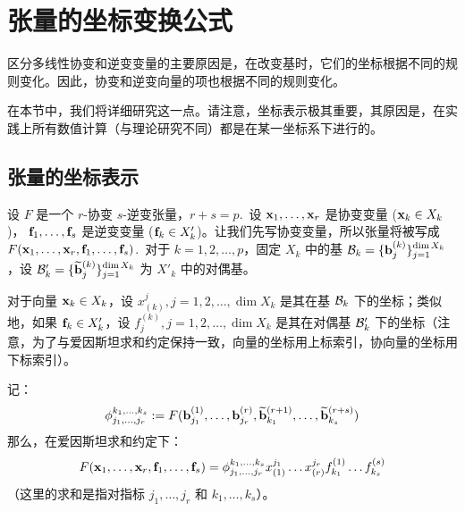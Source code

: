 \section{张量的坐标变换公式}\label{sec:08-06}


区分多线性协变和逆变变量的主要原因是，在改变基时，它们的坐标根据不同的规则变化。因此，协变和逆变向量的项也根据不同的规则变化。

在本节中，我们将详细研究这一点。请注意，坐标表示极其重要，其原因是，在实践上所有数值计算（与理论研究不同）都是在某一坐标系下进行的。

\subsection{张量的坐标表示}\label{sec:08-06-01}
设 $F$ 是一个 $r$-协变 $s$-逆变张量，$r+s=p$.~设 $\mathbf{x}_1, \dots, \mathbf{x}_r$ 是协变变量 ($\mathbf{x}_k \in X_k$)， $\mathbf{f}_1, \dots, \mathbf{f}_s$ 是逆变变量 ($\mathbf{f}_k \in X'_k$)。让我们先写协变变量，所以张量将被写成 $F(\mathbf{x}_1, \dots, \mathbf{x}_r, \mathbf{f}_1, \dots, \mathbf{f}_s)$.~对于 $k=1, 2, \dots, p$，固定 $X_k$ 中的基 $\mathcal{B}_k = \{\mathbf{b}^{(k)}_j\}^{\dim X_k}_{j=1}$，设 $\mathcal{B}'_k = \{\widetilde{\mathbf{b}}^{(k)}_j\}^{\dim X_k}_{j=1}$ 为 $X'_k$ 中的对偶基。

对于向量 $\mathbf{x}_k \in X_k$，设 $x^j_{(k)}, j = 1, 2, \dots, \dim X_k$ 是其在基 $\mathcal{B}_k$ 下的坐标；类似地，如果 $\mathbf{f}_k \in X'_k$，设 $f_j^{(k)}, j = 1, 2, \dots, \dim X_k$ 是其在对偶基 $\mathcal{B}'_k$ 下的坐标（注意，为了与爱因斯坦求和约定保持一致，向量的坐标用上标索引，协向量的坐标用下标索引）。

\begin{proposition}\label{stmt:08-06-01}
记：
\begin{equation}\label{eq:08-06-01}
\phi_{j_1, \dots, j_r}^{k_1, \dots, k_s} := F(\mathbf{b}^{(1)}_{j_1}, \dots, \mathbf{b}^{(r)}_{j_r}, \widetilde{\mathbf{b}}^{(r+1)}_{k_1}, \dots, \widetilde{\mathbf{b}}^{(r+s)}_{k_s})
\end{equation}
那么，在爱因斯坦求和约定下：
\begin{equation}\label{eq:08-06-02}
F(\mathbf{x}_1, \dots, \mathbf{x}_r, \mathbf{f}_1, \dots, \mathbf{f}_s) = \phi_{j_1, \dots, j_r}^{k_1, \dots, k_s} x_{(1)}^{j_1} \dots x_{(r)}^{j_r} f^{(1)}_{k_1} \dots f^{(s)}_{k_s}
\end{equation}
（这里的求和是指对指标 $j_1, \dots, j_r$ 和 $k_1, \dots, k_s$）。
\end{proposition}

